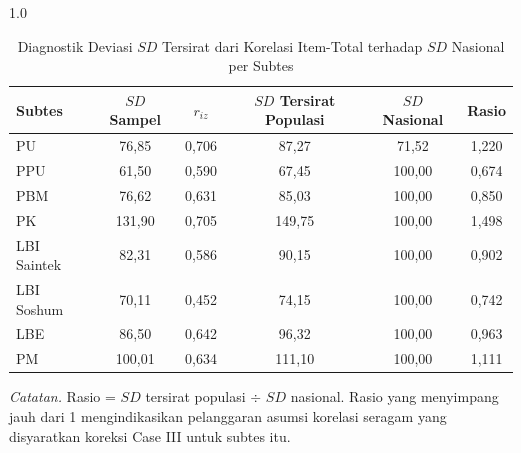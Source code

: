 \begin{table}[H]
    \centering
    \caption{Diagnostik Deviasi $SD$ Tersirat dari Korelasi Item-Total terhadap $SD$ Nasional per Subtes}
    \label{tab:diagnostik}
    \begin{spacing}{1.0}
    \begin{tabular}{lccccc}
        \toprule
        Subtes & $SD$ Sampel & $r_{iz}$ & $SD$ Tersirat Populasi & $SD$ Nasional & Rasio \\
        \midrule
        PU              & 76,85 & 0,706 & 87,27 & 71,52 & 1,220 \\
        PPU             & 61,50 & 0,590 & 67,45 & 100,00 & 0,674 \\
        PBM             & 76,62 & 0,631 & 85,03 & 100,00 & 0,850 \\
        PK              & 131,90 & 0,705 & 149,75 & 100,00 & 1,498 \\
        LBI Saintek     & 82,31 & 0,586 & 90,15 & 100,00 & 0,902 \\
        LBI Soshum      & 70,11 & 0,452 & 74,15 & 100,00 & 0,742 \\
        LBE             & 86,50 & 0,642 & 96,32 & 100,00 & 0,963 \\
        PM              & 100,01 & 0,634 & 111,10 & 100,00 & 1,111 \\
        \bottomrule
    \end{tabular}
    \end{spacing}
    \vspace{2mm}
    \begin{flushleft}
    \footnotesize\textit{Catatan.} Rasio = $SD$ tersirat populasi $\div$ $SD$ nasional. Rasio yang menyimpang jauh dari 1 mengindikasikan pelanggaran asumsi korelasi seragam yang disyaratkan koreksi Case III untuk subtes itu.
    \end{flushleft}
\end{table}
